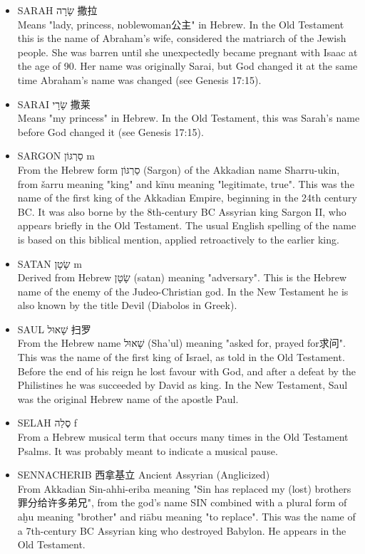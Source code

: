 \begin{itemize}
\item SARAH שָׂרָה 撒拉 \\
Means "lady, princess, noblewoman公主" in Hebrew. In the Old Testament this is the name of Abraham's wife, considered the matriarch of the Jewish people. She was barren until she unexpectedly became pregnant with Isaac at the age of 90. Her name was originally Sarai, but God changed it at the same time Abraham's name was changed (see Genesis 17:15).
\item SARAI שָׂרָי 撒莱 \\
Means "my princess" in Hebrew. In the Old Testament, this was Sarah's name before God changed it (see Genesis 17:15).
\item SARGON סַרְגּוֹן m \\
From the Hebrew form סַרְגּוֹן (Sargon) of the Akkadian name Sharru-ukin, from šarru meaning "king" and kīnu meaning "legitimate, true". This was the name of the first king of the Akkadian Empire, beginning in the 24th century BC. It was also borne by the 8th-century BC Assyrian king Sargon II, who appears briefly in the Old Testament. The usual English spelling of the name is based on this biblical mention, applied retroactively to the earlier king.
\item SATAN שָׂטָן m \\
Derived from Hebrew שָׂטָן (satan) meaning "adversary". This is the Hebrew name of the enemy of the Judeo-Christian god. In the New Testament he is also known by the title Devil (Diabolos in Greek).
\item SAUL שָׁאוּל 扫罗 \\
From the Hebrew name שָׁאוּל (Sha'ul) meaning "asked for, prayed for求问". This was the name of the first king of Israel, as told in the Old Testament. Before the end of his reign he lost favour with God, and after a defeat by the Philistines he was succeeded by David as king. In the New Testament, Saul was the original Hebrew name of the apostle Paul.
\item SELAH סֶלַה f \\
From a Hebrew musical term that occurs many times in the Old Testament Psalms. It was probably meant to indicate a musical pause.
\item SENNACHERIB 西拿基立 Ancient Assyrian (Anglicized)  \\
From Akkadian Sin-ahhi-eriba meaning "Sin has replaced my (lost) brothers罪分给许多弟兄", from the god's name SIN combined with a plural form of aḫu meaning "brother" and riābu meaning "to replace". This was the name of a 7th-century BC Assyrian king who destroyed Babylon. He appears in the Old Testament.

\end{itemize}
